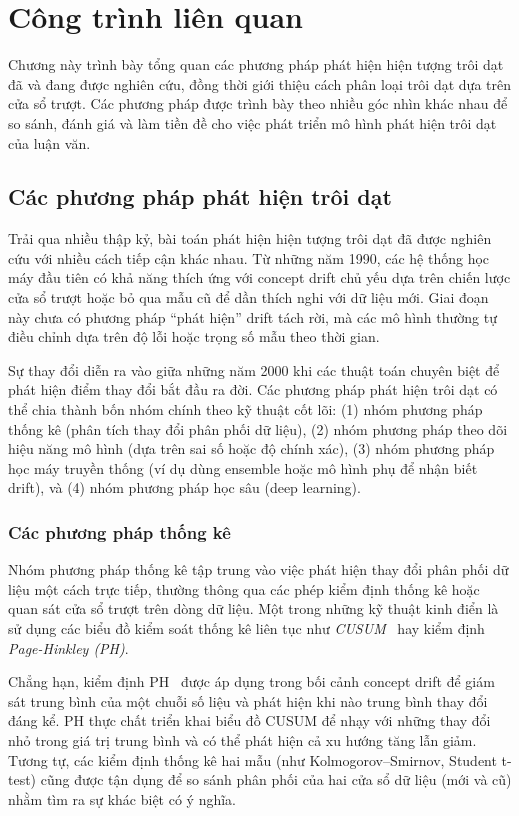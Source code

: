 \chapter{Công trình liên quan}
\label{chap:related-work}

Chương này trình bày tổng quan các phương pháp phát hiện hiện tượng trôi dạt đã và đang được nghiên cứu, đồng thời giới thiệu cách phân loại trôi dạt dựa trên cửa sổ trượt. Các phương pháp được trình bày theo nhiều góc nhìn khác nhau để so sánh, đánh giá và làm tiền đề cho việc phát triển mô hình phát hiện trôi dạt của luận văn.

\section{Các phương pháp phát hiện trôi dạt}
Trải qua nhiều thập kỷ, bài toán phát hiện hiện tượng trôi dạt đã được nghiên cứu với nhiều cách tiếp cận khác nhau.
Từ những năm 1990, các hệ thống học máy đầu tiên có khả năng thích ứng với concept drift chủ yếu dựa trên chiến lược cửa sổ trượt hoặc bỏ qua mẫu cũ để dần thích nghi với dữ liệu mới. Giai đoạn này chưa có phương pháp ``phát hiện'' drift tách rời, mà các mô hình thường tự điều chỉnh dựa trên độ lỗi hoặc trọng số mẫu theo thời gian.

Sự thay đổi diễn ra vào giữa những năm 2000 khi các thuật toán chuyên biệt để phát hiện điểm thay đổi bắt đầu ra đời. Các phương pháp phát hiện trôi dạt có thể chia thành bốn nhóm chính theo kỹ thuật cốt lõi: (1) nhóm phương pháp thống kê (phân tích thay đổi phân phối dữ liệu), (2) nhóm phương pháp theo dõi hiệu năng mô hình (dựa trên sai số hoặc độ chính xác), (3) nhóm phương pháp học máy truyền thống (ví dụ dùng ensemble hoặc mô hình phụ để nhận biết drift), và (4) nhóm phương pháp học sâu (deep learning).
\subsection{Các phương pháp thống kê}
Nhóm phương pháp thống kê tập trung vào việc phát hiện thay đổi phân phối dữ liệu một cách trực tiếp, thường
thông qua các phép kiểm định thống kê hoặc quan sát cửa sổ trượt trên dòng dữ liệu. Một trong những kỹ thuật
kinh điển là sử dụng các biểu đồ kiểm soát thống kê liên tục như \textit{CUSUM}~\cite{page1954continuous} hay kiểm định \textit{Page-Hinkley (PH)}.

Chẳng hạn, kiểm định PH~\cite{page1954continuous,hinkley1971cumulative} được áp dụng trong bối cảnh concept drift để giám sát trung bình của một chuỗi
số liệu và phát hiện khi nào trung bình thay đổi đáng kể. PH thực chất triển khai biểu đồ CUSUM để nhạy với những thay đổi
nhỏ trong giá trị trung bình và có thể phát hiện cả xu hướng tăng lẫn giảm. Tương tự, các kiểm định thống kê hai
mẫu (như Kolmogorov–Smirnov, Student t-test) cũng được tận dụng để so sánh phân phối của hai cửa sổ dữ liệu (mới và cũ)
nhằm tìm ra sự khác biệt có ý nghĩa.

